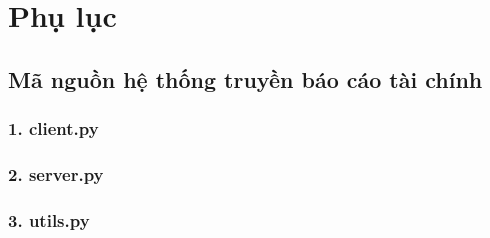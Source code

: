 \chapter*{Phụ lục}

\section*{Mã nguồn hệ thống truyền báo cáo tài chính}

\subsection*{1. client.py}


\subsection*{2. server.py}


\subsection*{3. utils.py}


\vspace{1cm}


